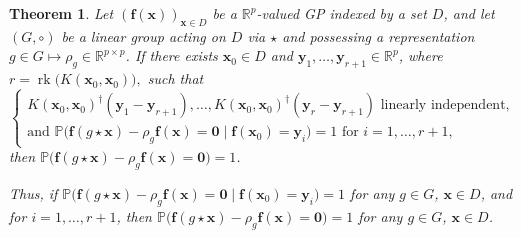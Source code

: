 \documentclass[11pt,a4paper]{article}
\newcommand{\R}{\mathbb{R}}
\newcommand{\bff}{\boldsymbol{f}}
\newcommand{\bx}{\boldsymbol{x}}
\newcommand{\by}{\boldsymbol{y}}
\newtheorem{thm}{Theorem}[section]
\begin{document}

\begin{thm}
\label{thm:finite response equiv}
Let $(\bff(\bx))_{\bx\in D}$ be a $\R^p$-valued GP indexed by a set $D$, and let $(G,\circ)$ be a linear group acting on $D$ via $\star$ and possessing a representation $g\in G \mapsto \rho_g \in \R^{p\times p}$. If there exists $\bx_0 \in D$ and $\by_1,\dots,\by_{r+1} \in \R^{p}$, where $r=\operatorname{rk}\bigl(K(\bx_0,\bx_0)\bigr),$
such that
$$
\left\{
\begin{array}{l}
K(\bx_0,\bx_0)^{\dag}(\by_1-\by_{r+1}),\dots,K(\bx_0,\bx_0)^{\dag}(\by_r-\by_{r+1}) \text{ linearly independent}, \\
\text{and } \mathbb{P}\bigl(\bff(g\star \bx)-\rho_g\bff(\bx)=\bm 0 \mid \bff(\bx_0)=\by_i\bigr)=1 \text{ for } i=1,\dots,r+1,
\end{array}
\right.
$$
then $\mathbb{P}\bigl(\bff(g\star \bx)-\rho_g\bff(\bx)=\bm 0\bigr)=1$.

Thus, if $\mathbb{P}\bigl(\bff(g\star \bx)-\rho_g\bff(\bx)=\bm 0 \mid \bff(\bx_0)=\by_i\bigr)=1$ for any $g \in G$, $\bx\in D$, and for $i=1,\dots,r+1$, then $\mathbb{P}\bigl(\bff(g\star \bx)-\rho_g\bff(\bx)=\bm 0\bigr)=1$ for any $g \in G$, $\bx\in D$.
\end{thm}
\end{document}
